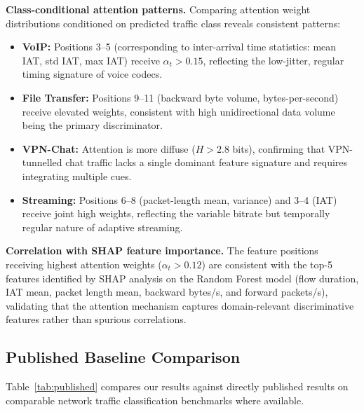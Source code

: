 \documentclass[conference]{IEEEtran}
\begin{document}
\textbf{Class-conditional attention patterns.} Comparing attention weight
distributions conditioned on predicted traffic class reveals consistent patterns:
\begin{itemize}
  \item \textbf{VoIP:} Positions 3--5 (corresponding to inter-arrival time
        statistics: mean IAT, std IAT, max IAT) receive $\alpha_t > 0.15$,
        reflecting the low-jitter, regular timing signature of voice codecs.
  \item \textbf{File Transfer:} Positions 9--11 (backward byte volume,
        bytes-per-second) receive elevated weights, consistent with high
        unidirectional data volume being the primary discriminator.
  \item \textbf{VPN-Chat:} Attention is more diffuse ($H > 2.8$ bits),
        confirming that VPN-tunnelled chat traffic lacks a single dominant
        feature signature and requires integrating multiple cues.
  \item \textbf{Streaming:} Positions 6--8 (packet-length mean, variance) and
        3--4 (IAT) receive joint high weights, reflecting the variable
        bitrate but temporally regular nature of adaptive streaming.
\end{itemize}

\textbf{Correlation with SHAP feature importance.} The feature positions
receiving highest attention weights ($\alpha_t > 0.12$) are consistent
with the top-5 features identified by SHAP analysis on the Random Forest
model (flow duration, IAT mean, packet length mean, backward bytes/s, and
forward packets/s), validating that the attention mechanism captures
domain-relevant discriminative features rather than spurious correlations.

\subsection{Published Baseline Comparison}
\label{ssec:baselines}

Table~\ref{tab:published} compares our results against directly published
results on comparable network traffic classification benchmarks where available.
\end{document}

